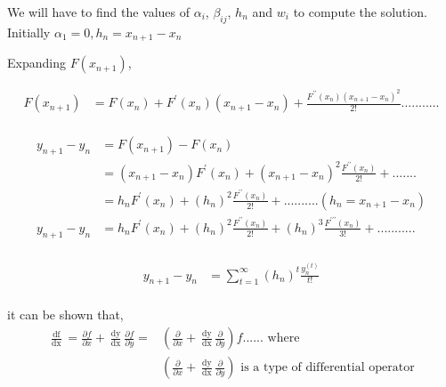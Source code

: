 \documentclass[12 pt]{article}
\begin{document}
We will have to find the values of $\alpha_{i}$, $\beta_{ij}$, $h_{n}$ and $w_{i}$ to compute the solution. Initially $\alpha_{1} = 0, h_{n}=x_{n+1}-x_{n}$

Expanding $F(x_{n+1})$,

{
\Large
\begin{align*}
F(x_{n+1}) &= F(x_{n}) + F^{\prime}(x_{n})(x_{n+1}-x_{n}) + \frac{F^{\prime\prime}(x_{n})(x_{n+1}-x_{n})^{2}}{2!}...........\\
\end{align*}
}

{
\Large
\begin{equation}
\begin{split}
y_{n+1}-y_{n} &= F(x_{n+1})-F(x_{n}) \\
			  &= (x_{n+1}-x_{n})F^{\prime}(x_{n}) + (x_{n+1}-x_{n})^{2} \frac{F^{\prime\prime}(x_{n})}{2!} + ....... \\
			  &= h_{n}F^{\prime}(x_{n}) + (h_{n})^{2}\frac{F^{\prime\prime}(x_{n})}{2!} + .......... (h_{n} = x_{n+1} - x_{n})\\
y_{n+1}-y_{n} &= h_{n}F^{\prime}(x_{n}) + (h_{n})^{2}\frac{F^{\prime\prime}(x_{n})}{2!} + (h_{n})^{3}\frac{F^{\prime\prime\prime}(x_{n})}{3!} + ........... \\
\end{split}
\end{equation}
}

{
\Large
\begin{equation}\label{E5}
\begin{split}
y_{n+1}-y_{n} &= \sum_{t = 1}^{\infty}(h_{n})^{t}\frac{y_{n}^{(t)}}{t!}\\
\end{split}
\end{equation}
}

it can be shown that, 
{
	\Large
	\begin{equation*}
		\begin{split}
			\frac{\mathop{\mathrm{df}}}{\mathop{\mathrm{dx}}} = \frac{\partial f}{\partial x} + \frac{\mathop{\mathrm{dy}}}{\mathop{\mathrm{dx}}}\frac{\partial f}{\partial y} =&  (\frac{\partial }{\partial x} + \frac{\mathop{\mathrm{dy}}}{\mathop{\mathrm{dx}}}\frac{\partial }{\partial y})f \text{...... where }\\
			& (\frac{\partial }{\partial x} + \frac{\mathop{\mathrm{dy}}}{\mathop{\mathrm{dx}}}\frac{\partial }{\partial y}) \text{ is a type of differential operator}\\
		\end{split}
	\end{equation*}
}
\end{document}
